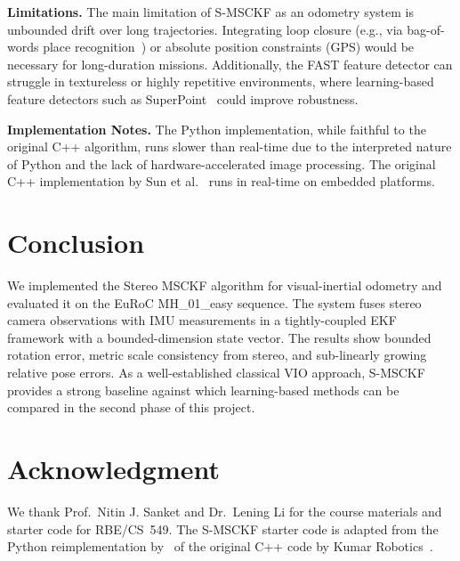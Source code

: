 \documentclass[conference]{IEEEtran}
\begin{document}
\textbf{Limitations.} The main limitation of S-MSCKF as an odometry system is unbounded drift over long trajectories. Integrating loop closure (e.g., via bag-of-words place recognition~\cite{galvez2012}) or absolute position constraints (GPS) would be necessary for long-duration missions. Additionally, the FAST feature detector can struggle in textureless or highly repetitive environments, where learning-based feature detectors such as SuperPoint~\cite{detone2018} could improve robustness.

\textbf{Implementation Notes.} The Python implementation, while faithful to the original C++ algorithm, runs slower than real-time due to the interpreted nature of Python and the lack of hardware-accelerated image processing. The original C++ implementation by Sun et al.~\cite{sun2018} runs in real-time on embedded platforms.

\section{Conclusion}

We implemented the Stereo MSCKF algorithm for visual-inertial odometry and evaluated it on the EuRoC MH\_01\_easy sequence. The system fuses stereo camera observations with IMU measurements in a tightly-coupled EKF framework with a bounded-dimension state vector. The results show bounded rotation error, metric scale consistency from stereo, and sub-linearly growing relative pose errors. As a well-established classical VIO approach, S-MSCKF provides a strong baseline against which learning-based methods can be compared in the second phase of this project.

\section*{Acknowledgment}
We thank Prof.~Nitin J. Sanket and Dr.~Lening Li for the course materials and starter code for RBE/CS~549. The S-MSCKF starter code is adapted from the Python reimplementation by~\cite{pymsckf} of the original C++ code by Kumar Robotics~\cite{kumarmsckf}.
\end{document}
